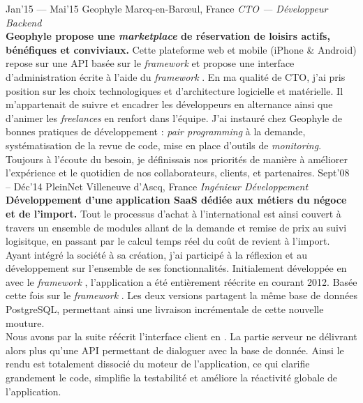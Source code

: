 \documentclass[print]{cv} %
\begin{document}
\begin{entrylist}
\entry
{Jan'15 — Mai'15}
{Geophyle}
{Marcq-en-Barœul, France}
{\emph{CTO — Développeur Backend}
\vspace{5pt}\\
\textbf{Geophyle propose une \emph{marketplace} de réservation de loisirs actifs, bénéfiques et conviviaux.}
Cette plateforme web et mobile (iPhone \& Android) repose sur une API  basée sur le \emph{framework}  et propose une interface d'administration écrite à l'aide du \emph{framework} .
\vspace{5pt}
En ma qualité de CTO, j'ai pris position sur les choix technologiques et d'architecture logicielle et matérielle. Il m'appartenait de suivre et encadrer les développeurs en alternance ainsi que d'animer les \emph{freelances} en renfort dans l'équipe. J'ai instauré chez Geophyle de bonnes pratiques de développement : \emph{pair programming} à la demande, systématisation de la revue de code, mise en place d'outils de \emph{monitoring}. Toujours à l'écoute du besoin, je définissais nos priorités de manière à améliorer l'expérience et le quotidien de nos collaborateurs, clients, et partenaires.
}
\entry
{Sept'08 – Déc'14}
{PleinNet}
{Villeneuve d'Ascq, France}
{\emph{Ingénieur Développement}
\vspace{5pt}\\
\textbf{Développement d'une application SaaS dédiée aux métiers du négoce et de l'import.} Tout le processus d'achat à l'international est ainsi couvert à travers un ensemble de modules allant de la demande et remise de prix au suivi logisitque, en passant par le calcul temps réel du coût de revient à l'import.
\vspace{5pt}
Ayant intégré la société à sa création, j'ai participé à la réflexion et au développement sur l'ensemble de ses fonctionnalités. Initialement développée en  avec le \emph{framework} , l'application a été entièrement réécrite en  courant 2012. Basée cette fois sur le \emph{framework} . Les deux versions partagent la même base de données PostgreSQL, permettant ainsi une livraison incrémentale de cette nouvelle mouture.
\vspace{5pt}\\
Nous avons par la suite réécrit l'interface client en . La partie serveur ne délivrant alors plus qu'une API permettant de dialoguer avec la base de donnée. Ainsi le rendu est totalement dissocié du moteur de l'application, ce qui clarifie grandement le code, simplifie la testabilité et améliore la réactivité globale de l'application.
}
\end{entrylist}
\end{document}
